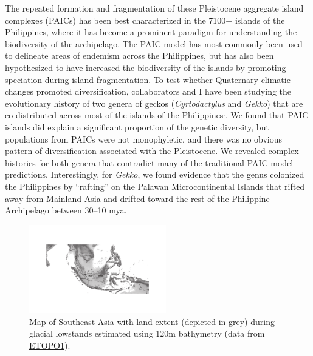 \documentclass[10pt]{article}
\newcommand{\super}[1]{\ensuremath{^{\textrm{#1}}}}
\begin{document}
The repeated formation and fragmentation of these Pleistocene aggregate island
complexes (PAICs) has been best characterized in the 7100+ islands of the
Philippines, where it has become a prominent paradigm for understanding the
biodiversity of the archipelago.
The PAIC model has most commonly been used to delineate areas of endemism
across the Philippines, but has also been hypothesized to have increased the
biodiversity of the islands by promoting speciation during island
fragmentation.
To test whether Quaternary climatic changes promoted diversification,
collaborators and I have been studying the evolutionary history of two genera
of geckos (\emph{Cyrtodactylus} and \emph{Gekko}) that are co-distributed
across most of the islands of the
Philippines\super{,}.
We found that PAIC islands did explain a significant proportion of the genetic
diversity, but populations from PAICs were not monophyletic, and there was no
obvious pattern of diversification associated with the Pleistocene.
We revealed complex histories for both genera that contradict many of the
traditional PAIC model predictions.
Interestingly, for \emph{Gekko}, we found evidence that the genus colonized the
Philippines by ``rafting'' on the Palawan Microcontinental Islands that rifted
away from Mainland Asia and drifted toward the rest of the Philippine
Archipelago between 30--10 mya.

\begin{figure}
  \vspace{-1.5em}
  \begin{center}
    \includegraphics[width=0.53\textwidth]{sunda_shelf_small.pdf}
  \end{center}
  \vspace{-0.2em}
  \caption{Map of Southeast Asia with land extent (depicted in grey) during
  glacial lowstands estimated using 120m bathymetry (data from
  \href{http://ngdc.noaa.gov/mgg/global/global.html}{ETOPO1}).}
  \label{map}
  \vspace{-1.1em}
\end{figure}
\end{document}
